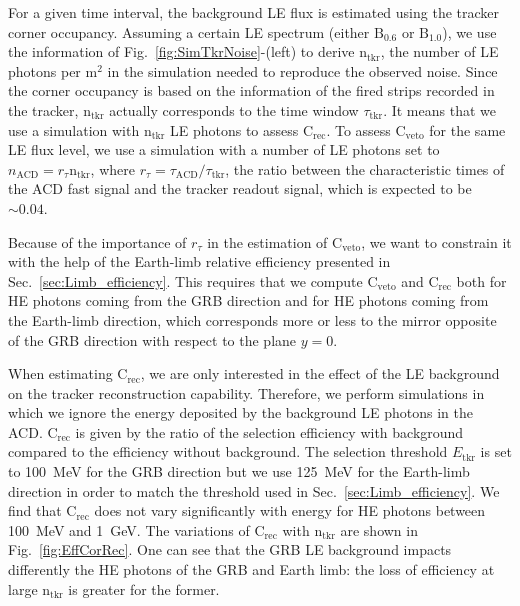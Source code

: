 \documentclass[preprint]{aastex631}
\begin{document}
For a given time interval, the background LE flux is estimated using the tracker corner occupancy. Assuming a certain LE spectrum (either $\mathrm{B}_{0.6}$ or $\mathrm{B}_{1.0}$), we use the information of Fig.~\ref{fig:SimTkrNoise}-(left) to derive $\mathrm{n}_\mathrm{tkr}$, the number of LE photons per $\mathrm{m}^2$ in the simulation needed to reproduce the observed noise. Since the corner occupancy is based on the information of the fired strips recorded in the tracker, $\mathrm{n}_\mathrm{tkr}$ actually corresponds to the time window $\tau_\mathrm{tkr}$. It means that we use a simulation with $\mathrm{n}_\mathrm{tkr}$ LE photons to assess $\mathrm{C}_\mathrm{rec}$. To assess $\mathrm{C}_\mathrm{veto}$ for the same LE flux level, we use a simulation with a number of LE photons set to $n_\mathrm{ACD} = r_\tau \mathrm{n}_\mathrm{tkr}$, where $r_\tau = \tau_\mathrm{ACD}/\tau_\mathrm{tkr}$, the ratio between the characteristic times of the ACD fast signal and the tracker readout signal, which is expected to be $\sim 0.04$. 

Because of the importance of $r_\tau$ in the estimation of $\mathrm{C}_\mathrm{veto}$, we want to constrain it with the help of the Earth-limb relative efficiency presented in Sec.~\ref{sec:Limb_efficiency}. This requires that we compute $\mathrm{C}_\mathrm{veto}$ and $\mathrm{C}_\mathrm{rec}$ both for HE photons coming from the GRB direction and for HE photons coming from the Earth-limb direction, which corresponds more or less to the mirror opposite of the GRB direction with respect to the plane $y=0$.

When estimating $\mathrm{C}_\mathrm{rec}$, we are only interested in the effect of the LE background on the tracker reconstruction capability. Therefore, we perform simulations in which we ignore the energy deposited by the background LE photons in the ACD. $\mathrm{C}_\mathrm{rec}$ is given by the ratio of the selection efficiency with background compared to the efficiency without background. The selection threshold $E_\mathrm{tkr}$ is set to 100~MeV for the GRB direction but we use 125~MeV for the Earth-limb direction in order to match the threshold used in Sec.~\ref{sec:Limb_efficiency}. We find that $\mathrm{C}_\mathrm{rec}$ does not vary significantly with energy for HE photons between 100~MeV and 1~GeV. The variations of $\mathrm{C}_\mathrm{rec}$ with $\mathrm{n}_\mathrm{tkr}$ are shown in Fig.~\ref{fig:EffCorRec}. One can see that the GRB LE background impacts differently the HE photons of the GRB and Earth limb: the loss of efficiency at large $\mathrm{n}_\mathrm{tkr}$ is greater for the former.
\end{document}
